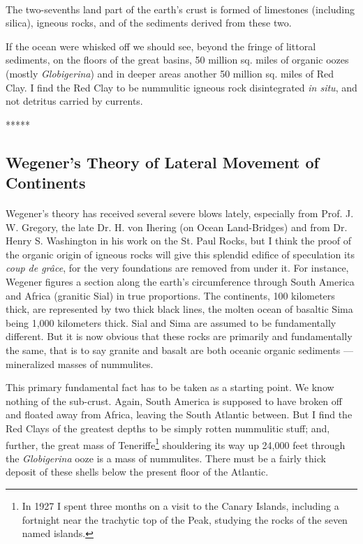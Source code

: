 \documentclass[a4paper, 12pt, oneside]{article}
\begin{document}
\paragraph{}
The two-sevenths land part of the earth's crust is formed of limestones (including silica), igneous rocks, and of the sediments derived from these two.

If the ocean were whisked off we should see, beyond the fringe of littoral sediments, on the floors of the great basins, 50 million sq. miles of organic oozes (mostly \emph{Globigerina}) and in deeper areas another 50 million sq. miles of Red Clay. I find the Red Clay to be nummulitic igneous rock disintegrated \emph{in situ}, and not detritus carried by currents.

\centerline{*\hspace{15mm}*\hspace{15mm}*\hspace{15mm}*\hspace{15mm}*}
\bigskip

\subsection{Wegener's Theory of Lateral Movement of Continents}
\paragraph{}
Wegener's theory has received several severe blows lately, especially from Prof. J. W. Gregory, the late Dr. H. von Ihering (on Ocean Land-Bridges) and from Dr. Henry S. Washington in his work on the St. Paul Rocks, but I think the proof of the organic origin of igneous rocks will give this splendid edifice of speculation its \emph{coup de grâce}, for the very foundations are removed from under it. For instance, Wegener figures a section along the earth's circumference through South America and Africa (granitic Sial) in true proportions. The continents, 100 kilometers thick, are represented by two thick black lines, the molten ocean of basaltic Sima being 1,000 kilometers thick. Sial and Sima are assumed to be fundamentally different. But it is now obvious that these rocks are primarily and fundamentally the same, that is to say granite and basalt are both oceanic organic sediments --- mineralized masses of nummulites.

This primary fundamental fact has to be taken as a starting point. We know nothing of the sub-crust. Again, South America is supposed to have broken off and floated away from Africa, leaving the South Atlantic between. But I find the Red Clays of the greatest depths to be simply rotten nummulitic stuff; and, further, the great mass of Teneriffe\footnote{In 1927 I spent three months on a visit to the Canary Islands, including a fortnight near the trachytic top of the Peak, studying the rocks of the seven named islands.} shouldering its way up 24,000 feet through the \emph{Globigerina} ooze is a mass of nummulites. There must be a fairly thick deposit of these shells below the present floor of the Atlantic.
\end{document}

